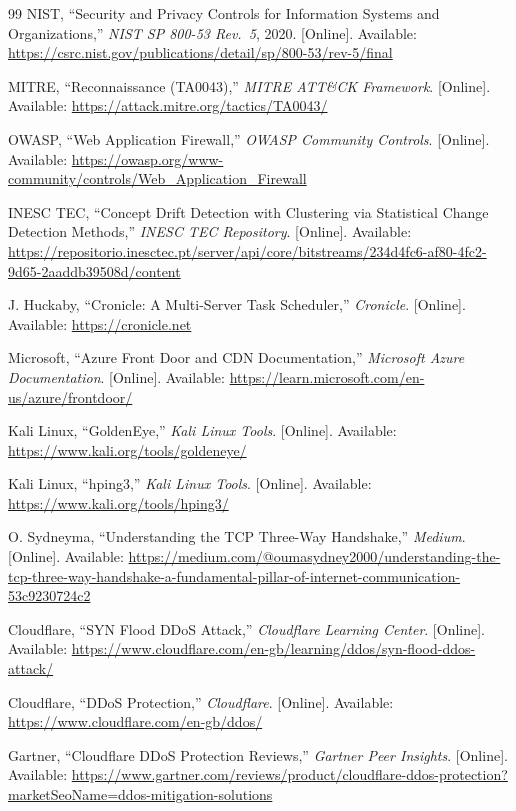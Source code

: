 \documentclass[12pt, a4paper]{report}   %
\begin{document}
\begin{thebibliography}{99}
NIST, ``Security and Privacy Controls for Information Systems and Organizations,''
\textit{NIST SP 800-53 Rev.\ 5}, 2020. [Online]. Available:
\url{https://csrc.nist.gov/publications/detail/sp/800-53/rev-5/final}

MITRE, ``Reconnaissance (TA0043),'' \textit{MITRE ATT\&CK Framework}. [Online].
Available: \url{https://attack.mitre.org/tactics/TA0043/}

OWASP, ``Web Application Firewall,'' \textit{OWASP Community Controls}. [Online].
Available: \url{https://owasp.org/www-community/controls/Web_Application_Firewall}

INESC TEC, ``Concept Drift Detection with Clustering via Statistical Change Detection
Methods,'' \textit{INESC TEC Repository}. [Online]. Available:
\url{https://repositorio.inesctec.pt/server/api/core/bitstreams/234d4fc6-af80-4fc2-9d65-2aaddb39508d/content}

J. Huckaby, ``Cronicle: A Multi-Server Task Scheduler,'' \textit{Cronicle}.
[Online]. Available: \url{https://cronicle.net}

Microsoft, ``Azure Front Door and CDN Documentation,'' \textit{Microsoft Azure
Documentation}. [Online]. Available:
\url{https://learn.microsoft.com/en-us/azure/frontdoor/}

Kali Linux, ``GoldenEye,'' \textit{Kali Linux Tools}. [Online]. Available:
\url{https://www.kali.org/tools/goldeneye/}

Kali Linux, ``hping3,'' \textit{Kali Linux Tools}. [Online]. Available:
\url{https://www.kali.org/tools/hping3/}

O. Sydneyma, ``Understanding the TCP Three-Way Handshake,'' \textit{Medium}.
[Online]. Available:
\url{https://medium.com/@oumasydney2000/understanding-the-tcp-three-way-handshake-a-fundamental-pillar-of-internet-communication-53c9230724c2}

Cloudflare, ``SYN Flood DDoS Attack,'' \textit{Cloudflare Learning Center}.
[Online]. Available:
\url{https://www.cloudflare.com/en-gb/learning/ddos/syn-flood-ddos-attack/}

Cloudflare, ``DDoS Protection,'' \textit{Cloudflare}. [Online]. Available:
\url{https://www.cloudflare.com/en-gb/ddos/}

Gartner, ``Cloudflare DDoS Protection Reviews,'' \textit{Gartner Peer Insights}.
[Online]. Available:
\url{https://www.gartner.com/reviews/product/cloudflare-ddos-protection?marketSeoName=ddos-mitigation-solutions}


\end{thebibliography}
\end{document}
